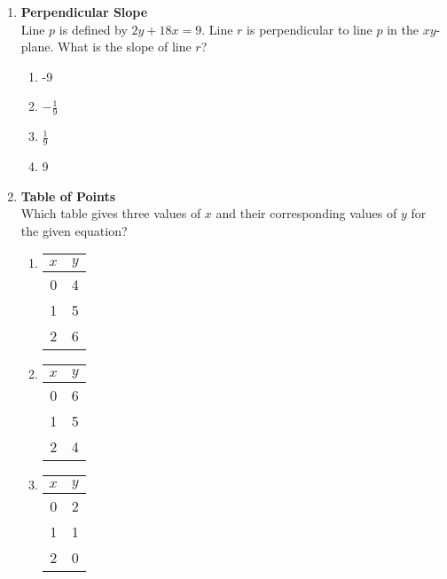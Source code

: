\begin{enumerate}
\item \textbf{Perpendicular Slope}\\
Line $p$ is defined by $2y + 18x = 9$. Line $r$ is perpendicular to line $p$ in the $xy$-plane. What is the slope of line $r$?
\begin{enumerate}[label=(\Alph*)]
  \item -9
  \item $-\frac{1}{9}$
  \item $\frac{1}{9}$
  \item 9
\end{enumerate}
\begin{subanswer}
\end{subanswer}

\item \textbf{Table of Points}\\
Which table gives three values of $x$ and their corresponding values of $y$ for the given equation?
\begin{enumerate}[label=(\Alph*)]
  \item
  \begin{center}
  \begin{tabular}{|c|c|}
  \hline
  $x$ & $y$ \\
  \hline
  0 & 4 \\
  \hline
  1 & 5 \\
  \hline
  2 & 6 \\
  \hline
  \end{tabular}
  \end{center}
  \item
  \begin{center}
  \begin{tabular}{|c|c|}
  \hline
  $x$ & $y$ \\
  \hline
  0 & 6 \\
  \hline
  1 & 5 \\
  \hline
  2 & 4 \\
  \hline
  \end{tabular}
  \end{center}
  \item
  \begin{center}
  \begin{tabular}{|c|c|}
  \hline
  $x$ & $y$ \\
  \hline
  0 & 2 \\
  \hline
  1 & 1 \\
  \hline
  2 & 0 \\
  \hline
  \end{tabular}

\end{center}
\end{enumerate}
\end{enumerate}
